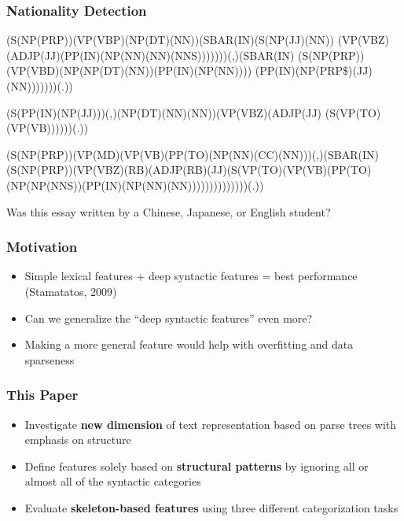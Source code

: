 \documentclass[handouti]{beamer}
\begin{document}
\begin{frame}
    \frametitle{Nationality Detection}

    {\small
    (S(NP(PRP))(VP(VBP)(NP(DT)(NN))(SBAR(IN)(S(NP(JJ)(NN))
    (VP(VBZ)(ADJP(JJ)(PP(IN)(NP(NN)(NN)(NNS)))))))(,)(SBAR(IN)
    (S(NP(PRP))(VP(VBD)(NP(NP(DT)(NN))(PP(IN)(NP(NN))))
    (PP(IN)(NP(PRP\$)(JJ)(NN)))))))(.))

    \vspace{.3in}
    (S(PP(IN)(NP(JJ)))(,)(NP(DT)(NN)(NN))(VP(VBZ)(ADJP(JJ)
    (S(VP(TO)(VP(VB))))))(.))

    \vspace{.3in}
    (S(NP(PRP))(VP(MD)(VP(VB)(PP(TO)(NP(NN)(CC)(NN)))(,)(SBAR(IN)
    (S(NP(PRP))(VP(VBZ)(RB)(ADJP(RB)(JJ)(S(VP(TO)(VP(VB)(PP(TO)
    (NP(NP(NNS))(PP(IN)(NP(NN)(NN))))))))))))))(.))
    }

        \vspace{.3in}
        \begin{center}
        {\normalsize Was this essay written by a Chinese, Japanese, or English
        student?}
        \end{center}
\end{frame}

\begin{frame}
    \frametitle{Motivation}
    \begin{itemize}
        \itemsep1.5em
        \item Simple lexical features + deep syntactic features = best
            performance {\normalsize (Stamatatos, 2009)}
        \item Can we generalize the ``deep syntactic features'' even more?
        \item Making a more general feature would help with overfitting and data
            sparseness
    \end{itemize}
\end{frame}

\begin{frame}
    \frametitle{This Paper}
    \begin{itemize}
        \itemsep1.5em
        \item Investigate \textbf{new dimension} of text representation based on
            parse trees with emphasis on structure
        \item Define features solely based on \textbf{structural patterns} by
            ignoring all or almost all of the syntactic categories
        \item Evaluate \textbf{skeleton-based features} using three different
            categorization tasks
    \end{itemize}
\end{frame}
\end{document}
